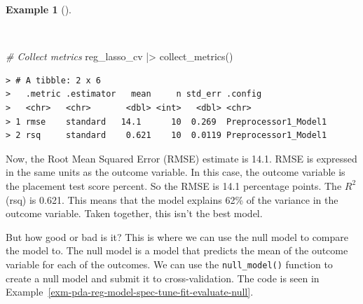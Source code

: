 \documentclass[
  letterpaper,
]{latex/krantz}
\newenvironment{Shaded}{\begin{snugshade}}{\end{snugshade}}
\newcommand{\CommentTok}[1]{\textcolor[rgb]{0.00,0.00,0.00}{\textit{#1}}}
\newcommand{\FunctionTok}[1]{\textcolor[rgb]{0.00,0.00,0.00}{#1}}
\newcommand{\NormalTok}[1]{\textcolor[rgb]{0.00,0.00,0.00}{#1}}
\newcommand{\SpecialCharTok}[1]{\textcolor[rgb]{0.00,0.00,0.00}{#1}}
\theoremstyle{definition}
\newtheorem{example}{Example}[chapter]
\theoremstyle{remark}
\begin{document}
\begin{example}[]\protect\hypertarget{exm-pda-reg-metrics-lasso}{}\label{exm-pda-reg-metrics-lasso}

~

\begin{Shaded}
\begin{Highlighting}[]
\CommentTok{\# Collect metrics}
\NormalTok{reg\_lasso\_cv }\SpecialCharTok{|\textgreater{}} \FunctionTok{collect\_metrics}\NormalTok{()}
\end{Highlighting}
\end{Shaded}

\begin{verbatim}
> # A tibble: 2 x 6
>   .metric .estimator   mean     n std_err .config             
>   <chr>   <chr>       <dbl> <int>   <dbl> <chr>               
> 1 rmse    standard   14.1      10  0.269  Preprocessor1_Model1
> 2 rsq     standard    0.621    10  0.0119 Preprocessor1_Model1
\end{verbatim}

\end{example}

Now, the Root Mean Squared Error (RMSE) estimate is 14.1. RMSE is
expressed in the same units as the outcome variable. In this case, the
outcome variable is the placement test score percent. So the RMSE is
14.1 percentage points. The \(R^2\) (rsq) is 0.621. This means that the
model explains 62\% of the variance in the outcome variable. Taken
together, this isn't the best model.

But how good or bad is it? This is where we can use the null model to
compare the model to. The null model is a model that predicts the mean
of the outcome variable for each of the outcomes. We can use the
\texttt{null\_model()} function to create a null model and submit it to
cross-validation. The code is seen in
Example~\ref{exm-pda-reg-model-spec-tune-fit-evaluate-null}.
\end{document}
